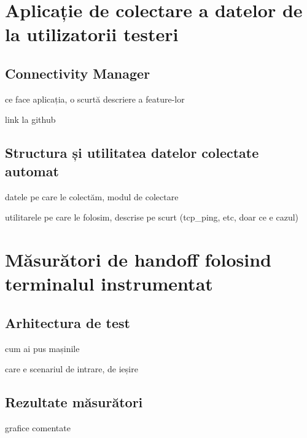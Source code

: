 \chapter{Aplicație de colectare a datelor de la utilizatorii testeri}

\section{Connectivity Manager}
ce face aplicația, o scurtă descriere a feature-lor

link la github 
\section{Structura și utilitatea datelor colectate automat}

datele pe care le colectăm, modul de colectare

utilitarele pe care le folosim, descrise pe scurt (tcp\_ping, etc, doar ce e cazul)

\chapter{Măsurători de handoff folosind terminalul instrumentat}
\section{Arhitectura de test}
cum ai pus mașinile

care e scenariul de intrare, de ieșire

\section{Rezultate măsurători}

grafice comentate
